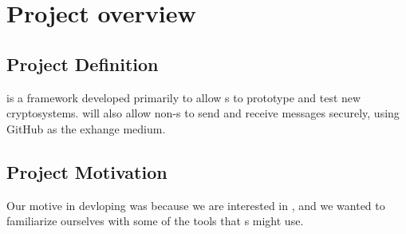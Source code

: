 \section{Project overview}


\subsection{Project Definition}
\cry{} is a framework developed primarily to allow
\cg{}s to prototype and test new cryptosystems. \cry{} will
also allow non-\cg{}s to send and receive messages
securely, using GitHub as the exhange medium.

\subsection{Project Motivation}
Our motive in devloping \cry{} was because we are interested
in \cgy{}, and we wanted to familiarize ourselves with
some of the tools that \cg{}s might use.
